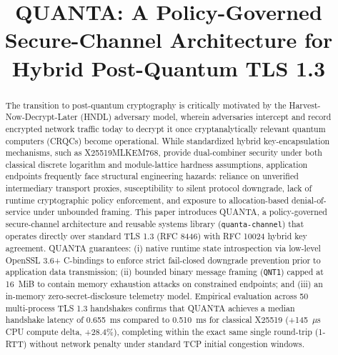 \documentclass[conference]{IEEEtran}
\begin{document}
\title{QUANTA: A Policy-Governed Secure-Channel Architecture for Hybrid Post-Quantum TLS 1.3\\
}

\author{
}

\maketitle

\begin{abstract}
The transition to post-quantum cryptography is critically motivated by the Harvest-Now-Decrypt-Later (HNDL) adversary model, wherein adversaries intercept and record encrypted network traffic today to decrypt it once cryptanalytically relevant quantum computers (CRQCs) become operational. While standardized hybrid key-encapsulation mechanisms, such as X25519MLKEM768, provide dual-combiner security under both classical discrete logarithm and module-lattice hardness assumptions, application endpoints frequently face structural engineering hazards: reliance on unverified intermediary transport proxies, susceptibility to silent protocol downgrade, lack of runtime cryptographic policy enforcement, and exposure to allocation-based denial-of-service under unbounded framing. This paper introduces QUANTA, a policy-governed secure-channel architecture and reusable systems library (\texttt{quanta-channel}) that operates directly over standard TLS 1.3 (RFC 8446) with RFC 10024 hybrid key agreement. QUANTA guarantees: (i) native runtime state introspection via low-level OpenSSL 3.6+ C-bindings to enforce strict fail-closed downgrade prevention prior to application data transmission; (ii) bounded binary message framing (\texttt{QNT1}) capped at 16~MiB to contain memory exhaustion attacks on constrained endpoints; and (iii) an in-memory zero-secret-disclosure telemetry model. Empirical evaluation across 50 multi-process TLS 1.3 handshakes confirms that QUANTA achieves a median handshake latency of 0.655~ms compared to 0.510~ms for classical X25519 (+145~$\mu$s CPU compute delta, +28.4\%), completing within the exact same single round-trip (1-RTT) without network penalty under standard TCP initial congestion windows.
\end{abstract}
\end{document}
